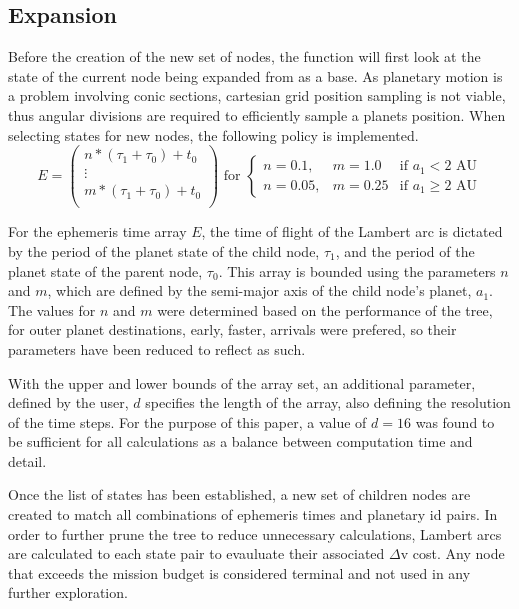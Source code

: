 \documentclass[letterpaper, preprint, paper,11pt]{AAS}	%
\begin{document}
\subsection{Expansion}
Before the creation of the new set of nodes, the function will first look at the state of the current node being expanded from as a base. As planetary motion is a problem involving conic sections, cartesian grid position sampling is not viable, thus angular divisions are required to efficiently sample a planets position. When selecting states for new nodes, the following policy is implemented. 
\begin{equation*}
    E = 
    \left(\begin{array}{c}
        n*(\tau_1 + \tau_0) + t_0 \\ 
        \vdots \\
        m*(\tau_1 + \tau_0) + t_0 \\
    \end{array}\right)
    \text{ for } 
    \left\{\begin{array}{llr} 
        n = 0.1, & m = 1.0 &\text{if } a_1 < 2 \text{ AU} \\ 
        n = 0.05, & m = 0.25 &\text{if } a_1 \geq 2 \text{ AU}
    \end{array}\right.
\end{equation*}

For the ephemeris time array $E$, the time of flight of the Lambert arc is dictated by the period of the planet state of the child node, $\tau_1$, and the period of the planet state of the parent node, $\tau_0$. This array is bounded using the parameters $n$ and $m$, which are defined by the semi-major axis of the child node's planet, $a_1$. The values for $n$ and $m$ were determined based on the performance of the tree, for outer planet destinations, early, faster, arrivals were prefered, so their parameters have been reduced to reflect as such. 

With the upper and lower bounds of the array set, an additional parameter, defined by the user, $d$ specifies the length of the array, also defining the resolution of the time steps. For the purpose of this paper, a value of $d = 16$ was found to be sufficient for all calculations as a balance between computation time and detail. 

Once the list of states has been established, a new set of children nodes are created to match all combinations of ephemeris times and planetary id pairs. In order to further prune the tree to reduce unnecessary calculations, Lambert arcs are calculated to each state pair to evauluate their associated $\Delta \text{v}$ cost. Any node that exceeds the mission budget is considered terminal and not used in any further exploration.
\end{document}
